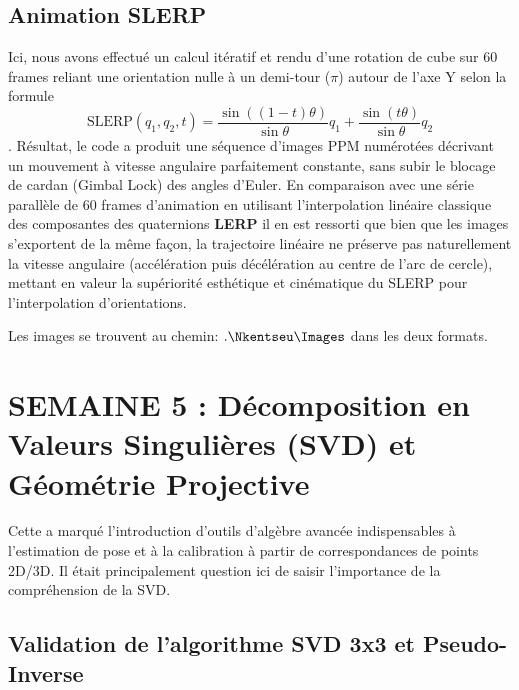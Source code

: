 \documentclass[12pt,a4paper]{report}
\begin{document}
\section{Animation SLERP}

Ici, nous avons effectué un calcul itératif et rendu d'une rotation de cube sur 60 frames reliant une orientation nulle à un demi-tour ($\pi$) autour de l'axe Y selon la formule $$\text{SLERP}(q_1, q_2, t) = \frac{\sin((1-t)\theta)}{\sin \theta}q_1 + \frac{\sin(t\theta)}{\sin \theta}q_2$$. Résultat, le code a produit une séquence d'images PPM numérotées décrivant un mouvement à vitesse angulaire parfaitement constante, sans subir le blocage de cardan (Gimbal Lock) des angles d'Euler.
En comparaison avec une série parallèle de 60 frames d'animation en utilisant l'interpolation linéaire classique des composantes des quaternions \textbf{LERP} il en est ressorti que bien que les images s'exportent de la même façon, la trajectoire linéaire ne préserve pas naturellement la vitesse angulaire (accélération puis décélération au centre de l'arc de cercle), mettant en valeur la supériorité esthétique et cinématique du SLERP pour l'interpolation d'orientations.

Les images se trouvent au chemin: $.\Nkentseu\Images$ dans les deux formats.



\chapter{SEMAINE 5 : Décomposition en Valeurs Singulières (SVD) et Géométrie Projective}

Cette a marqué l'introduction d'outils d'algèbre avancée indispensables à l'estimation de pose et à la calibration à partir de correspondances de points 2D/3D. Il était principalement question ici de saisir l'importance  de la compréhension de la SVD.

\section{Validation de l'algorithme SVD 3x3 et Pseudo-Inverse}
\end{document}
